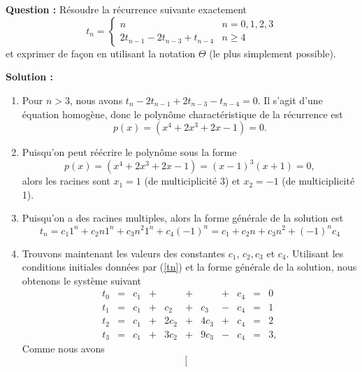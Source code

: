 \documentclass[11pt]{article} %
\newenvironment{question}[1][\unskip]{%
	\par
	\noindent
	\textbf{Question #1:}
	\noindent}
{\medskip}
\newenvironment{solution}[1][\unskip]{%
	\par
	\noindent
	\textbf{Solution #1:}
	\noindent}
{\medskip}
\begin{document}
\section{}
\begin{question}
	Résoudre la récurrence suivante exactement
	\begin{equation}
	\label{tn}
	t_n=\begin{cases}
	n & \text{$n=0,1,2,3$}\\
	2t_{n-1}-2t_{n-3}+t_{n-4}&n\geq 4
	\end{cases}
	\end{equation}
	et exprimer de façon en utilisant la notation $\Theta$ (le plus simplement possible).	
\end{question}
\begin{solution}
	\begin{enumerate}
		\item Pour $n>3$, nous avons $t_n-2t_{n-1}+2t_{n-3}-t_{n-4}=0$. Il s'agit d'une équation homogène, donc le polynôme charactéristique de la récurrence est $$p(x)=(x^4+2x^3 + 2x - 1)=0.$$
		\item Puisqu'on peut réécrire le polynôme sous la forme $$p(x) =(x^4+2x^3 + 2x - 1) = (x-1)^3(x+1)=0,$$ alors les racines sont $x_1 = 1$ (de multiciplicité 3) et $x_2 = -1$ (de multiciplicité 1).
		\item Puisqu'on a des racines multiples, alors la forme générale de la solution est
		$$t_n = c_1 1^n + c_2n 1^n+c_3n^2 1^n+c_4(-1)^n = c_1 + c_2 n + c_3 n^2 + (-1)^n c_4$$
		\item Trouvons maintenant les valeurs des constantes $c_1$, $c_2, c_3$ et $c_4$.
		Utilisant les conditions initiales données par (\ref{tn}) et la forme générale de la solution, nous obtenons le système suivant
		\begin{equation*}
		\begin{array}{ccccccccccc}
		t_0 & = & c_1 & + &  & + && + & c_4 &=& 0\\
		t_1 & = & c_1& + & c_2&  + & c_3 & - & c_4 &= & 1\\
		t_2 & = & c_1& + & 2c_2&  + & 4c_3 & + & c_4 &= & 2\\
		t_3 & = & c_1& + & 3c_2&  + & 9c_3 & - & c_4 &= & 3,
		\end{array}
		\end{equation*}
		Comme nous avons
		\begin{equation*}
		\left[\begin{array}{cccc|c}
	

\end{array}
\end{equation*}
\end{enumerate}
\end{solution}
\end{document}
